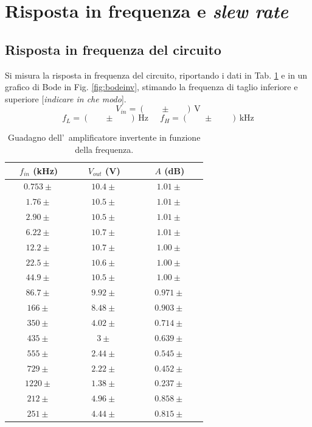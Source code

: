 \documentclass[10pt,a4paper]{article}
\newcommand{\rem}[1]{[\emph{#1}]}
\newcommand{\exn}{\phantom{xxx}}
\begin{document}
	\section{Risposta in frequenza e \emph{slew rate}}
	\subsection{Risposta in frequenza del circuito}
	Si misura la risposta in frequenza del circuito, riportando i dati  in Tab. \ref{tab:bodeinv} e
	in un grafico di Bode in Fig. \ref{fig:bodeinv}, stimando la frequenza di taglio inferiore e 
	superiore \rem{indicare in che modo}.
	\[
	V_{in} = (\exn \pm \exn )\,\mathrm{V}
	\]
	\[
	f_L = (\exn \pm \exn )\,\mathrm{Hz}\;\;\;\;\;f_H = (\exn \pm \exn \;)\,\mathrm{kHz}
	\]
	\begin{table}[h]
		\caption{\small Guadagno dell'~amplificatore invertente in funzione della frequenza.}
		\label{tab:bodeinv}
		\begin{center}
			\begin{tabular}{|c|c|c|}	\hline
				$f_{in}$ (kHz) & $V_{out}$ (V) & $A$ (dB) \\
				\hline
				$\exn0.753 \pm \exn $ & $\exn10.4 \pm \exn $ & $\exn 1.01\pm \exn $\\
				\hline
				$\exn 1.76\pm \exn $ & $\exn 10.5\pm \exn $ & $\exn 1.01\pm \exn $\\
				\hline
				$\exn 2.90\pm \exn $ & $\exn 10.5\pm \exn $ & $\exn 1.01\pm \exn $\\
				\hline
				$\exn 6.22\pm \exn $ & $\exn 10.7\pm \exn $ & $\exn 1.01\pm \exn $\\
				\hline
				$\exn 12.2\pm \exn $ & $\exn 10.7\pm \exn $ & $\exn 1.00\pm \exn $\\
				\hline
				$\exn22.5 \pm \exn $ & $\exn 10.6\pm \exn $ & $\exn1.00\pm \exn $\\
				\hline
				$\exn44.9 \pm \exn $ & $\exn10.5 \pm \exn $ & $\exn 1.00\pm \exn $\\
				\hline
				$\exn 86.7\pm \exn $ & $\exn9.92 \pm \exn $ & $\exn 0.971 \pm \exn $\\
				\hline
				$\exn 166\pm \exn $ & $\exn8.48 \pm \exn $ & $\exn 0.903 \pm \exn $\\
				\hline
				$\exn 350\pm \exn $ & $\exn 4.02\pm \exn $ & $\exn0.714\pm \exn $\\
				\hline
				$\exn 435\pm \exn $ & $\exn 3\pm \exn $ & $\exn 0.639\pm \exn $\\
				\hline
				$\exn555 \pm \exn $ & $\exn2.44 \pm \exn $ & $\exn 0.545 \pm \exn $\\
				\hline
				$\exn 729\pm \exn $ & $\exn 2.22\pm \exn $ & $\exn 0.452 \pm \exn $\\
				\hline
				$\exn 1220\pm \exn $ & $\exn 1.38\pm \exn $ & $\exn 0.237\pm \exn $\\
				\hline
				$\exn212\pm \exn $ & $\exn4.96 \pm \exn $ & $\exn 0.858 \pm \exn $\\
				\hline
				$\exn251 \pm \exn $ & $\exn4.44 \pm \exn $ & $\exn 0.815\pm \exn $\\


\end{tabular}
\end{center}
\end{table}
\end{document}
